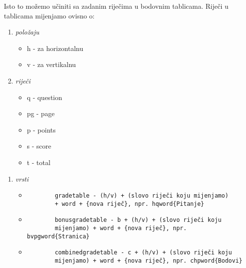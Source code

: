 \documentclass{beamer}
\begin{document}
\begin{frame}[fragile]
Isto to možemo učiniti sa zadanim riječima u bodovnim tablicama. Riječi u tablicama mijenjamo ovisno o:
\begin{enumerate}[1]
\item \emph{položaju}
	\begin{itemize}
	\item h - za horizontalnu
	\item v - za vertikalnu
	\end{itemize}

\item \emph{riječi}
	\begin{itemize}
	\item q - question
	\item pg - page
	\item p - points
	\item s - score
	\item t - total
	\end{itemize}
\end{enumerate}
\end{frame}

\begin{frame}[fragile]
\begin{enumerate}[3]
\item \emph{vrsti}
	\begin{itemize}
	\item 
		\begin{verbatim} 
		gradetable - (h/v) + (slovo riječi koju mijenjamo) 
		+ word + {nova riječ}, npr. hqword{Pitanje}
		\end{verbatim} 
\medskip
	\item 
		\begin{verbatim}
		bonusgradetable - b + (h/v) + (slovo riječi koju 
		mijenjamo) + word + {nova riječ}, npr. bvpgword{Stranica}
		\end{verbatim}
\medskip	
	\item 
		\begin{verbatim}
		combinedgradetable - c + (h/v) + (slovo riječi koju 
		mijenjamo) + word + {nova riječ}, npr. chpword{Bodovi}
		\end{verbatim}
	\end{itemize}

\end{enumerate}
\end{frame}
\end{document}
